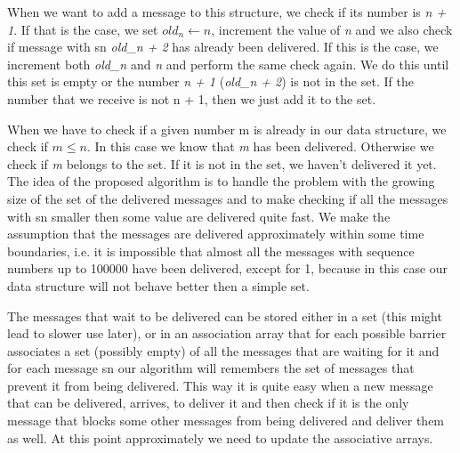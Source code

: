 \documentclass[12pt]{article}
\theoremstyle{plain}
\begin{document}
When we want to add a message to this structure, we check if its number is
\emph{n + 1}. If that is the case, we set $old_n \leftarrow n$, increment the
value of \emph{n} and we also check if message with sn \emph{old\_n + 2} has
already been delivered. If this is the case, we increment both \emph{old\_n} and
\emph{n} and perform the same check again. We do this until this set is empty
or the number \emph{n + 1} (\emph{old\_n + 2}) is not in the set. If the number
that we receive is not n + 1, then we just add it to the set.  

When we have to check if a given number m is already in our data structure, we
check if $m \le n$. In this case we know that \emph{m} has been delivered.
Otherwise we check if \emph{m} belongs to the set. If it is not in the set, we
haven't delivered it yet.  The idea of the proposed algorithm is to handle the
problem with the growing size of the set of the delivered messages and to make
checking if all the messages with sn smaller then some value are delivered quite
fast. We make the assumption that the messages are delivered approximately
within some time boundaries, i.e. it is impossible that almost all the messages
with sequence numbers up to 100000 have been delivered, except for 1, because
in this case our data structure will not behave better then a simple set.

The messages that wait to be delivered can be stored either in a set (this
might lead to slower use later), or in an association array that for each possible
barrier associates a set (possibly empty) of all the messages that are waiting
for it and for each message sn our algorithm will remembers the set of messages
that prevent it from being delivered. This way it is quite easy when a new message
that can be delivered, arrives, to deliver it and then check if it is the only
message that blocks some other messages from being delivered and deliver them as
well. At this point approximately we need to update the associative arrays.
\end{document}
